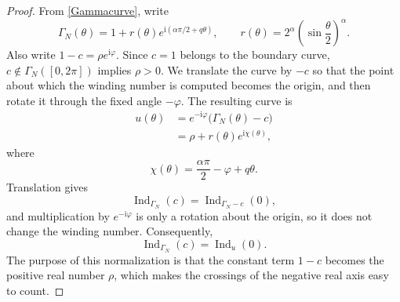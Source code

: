 \documentclass[11pt,a4paper]{article}
\theoremstyle{definition}
\begin{document}
\begin{proof}
From \eqref{Gammacurve}, write
\begin{equation*}
\Gamma_N(\theta)
=1+r(\theta)e^{\mathrm{i}(\alpha\pi/2+q\theta)},
\qquad
r(\theta)=2^\alpha\left(\sin\frac{\theta}{2}\right)^\alpha.
\end{equation*}
Also write $1-c=\rho e^{\mathrm{i}\varphi}$. Since $c=1$ belongs to the boundary curve, $c\notin\Gamma_N([0,2\pi])$ implies $\rho>0$. We translate the curve by $-c$ so that the point about which the winding number is computed becomes the origin, and then rotate it through the fixed angle $-\varphi$. The resulting curve is
\begin{equation*}
\begin{split}
u(\theta)
&=e^{-\mathrm{i}\varphi}\bigl(\Gamma_N(\theta)-c\bigr)\\
&=\rho+r(\theta)e^{\mathrm{i}\chi(\theta)},
\end{split}
\end{equation*}
where
\begin{equation*}
\chi(\theta)=\frac{\alpha\pi}{2}-\varphi+q\theta.
\end{equation*}
Translation gives
\begin{equation*}
\operatorname{Ind}_{\Gamma_N}(c)
=\operatorname{Ind}_{\Gamma_N-c}(0),
\end{equation*}
and multiplication by $e^{-\mathrm{i}\varphi}$ is only a rotation about the origin, so it does not change the winding number. Consequently,
\begin{equation*}
\operatorname{Ind}_{\Gamma_N}(c)=\operatorname{Ind}_{u}(0).
\end{equation*}
The purpose of this normalization is that the constant term $1-c$ becomes the positive real number $\rho$, which makes the crossings of the negative real axis easy to count.


\end{proof}
\end{document}
